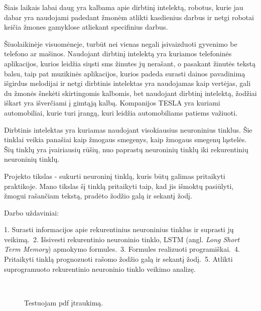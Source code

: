Šiais laikais labai daug yra kalbama apie dirbtinį intelektą, robotus, kurie jau dabar yra naudojami padedant žmonėm atlikti kasdienius darbus ir netgi robotai keičia žmones gamyklose atliekant specifinius darbus.

Šiuolaikinėje visuomėneje, turbūt nei vienas negali įsivaizduoti gyvenimo be telefono ar mašinos. Naudojant dirbtinį intelektą yra kuriamos telefoninės aplikacijos, kurios leidžia siųsti sms žinutes jų nerašant, o pasakant žinutės tekstą balsu, taip pat muzikinės aplikacijos, kurios padeda surasti dainos pavadinimą išgirdus melodijai ir netgi dirbtinis intelektas yra naudojamas kaip vertėjas, gali du žmonės šnekėti skirtingomis kalbomis, bet naudojant dirbtinį intelektą, žodžiai iškart yra išverčiami į gimtąją kalbą. Kompanijos TESLA yra kuriami automobiliai, kurie turi įrangą, kuri leidžia automobiliams patiems važiuoti.

Dirbtinis intelektas yra kuriamas naudojant visokiausius neuroninius tinklus. Šie tinklai veikia panašiai kaip žmogaus smegenys, kaip žmogaus smegenų ląstelės. Šių tinklų yra įvairiausių rūšių, nuo paprastų neuroninių tinklų iki rekurentinių neuroninių tinklų.

Projekto tikslas - sukurti neuroninį tinklą, kuris būtų galimas pritaikyti praktikoje. Mano tikslas šį tinklą pritaikyti taip, kad jis išmoktų pasiūlyti, žmogui rašančiam tekstą, pradėto žodžio galą ir sekantį žodį.

Darbo uždaviniai:

1. Surasti informacijos apie rekurentinius neuroninius tinklus ir suprasti jų veikimą.\
2. Išsivesti rekurentinio neuroninio tinklo, LSTM (angl. \textit{Long Short Term Memory}) apmokymo formules.\
3. Formules realizuoti programiškai.\
4. Pritaikyti tinklą prognozuoti rašomo žodžio galą ir sekantį žodį.\
5. Atlikti suprogramuoto rekurentinio neuroninio tinklo veikimo analizę.\


\begin{math}\end{math}


\begin{figure}
  \centering
{}
\caption{Testuojam pdf įtraukimą.}
\end{figure}
